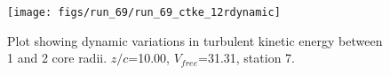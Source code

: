 \begin{figure}[H]
\centering
\texttt{[image: figs/run\_69/run\_69\_ctke\_12rdynamic]}
\caption{Plot showing dynamic variations in turbulent kinetic energy between 1 and 2 core radii. $z/c$=10.00, $V_{free}$=31.31, station 7.}
\end{figure}


